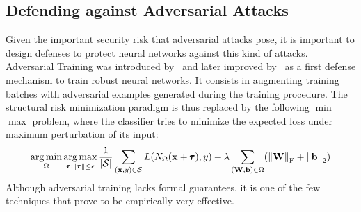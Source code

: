 \subsection{Defending against Adversarial Attacks}
\label{subsection:ch2-defending_against_adversarial_attacks}

Given the important security risk that adversarial attacks pose, it is important to design defenses to protect neural networks against this kind of attacks.
Adversarial Training was introduced by~\citet{goodfellow2014explaining} and later improved by~\citet{madry2018towards} as a first defense mechanism to train robust neural networks.
It consists in augmenting training batches with adversarial examples generated during the training procedure.
The structural risk minimization paradigm is thus replaced by the following $\min$ $\max$ problem, where the classifier tries to minimize the expected loss under maximum perturbation of its input:
\begin{equation}
\argmin_\Omega \argmax_{\adv: \norm{\adv} \leq \epsilon} \frac{1}{|\mathcal{S}|} \sum_{(\xvec, y) \in \mathcal{S}} L\left( N_\Omega \left(\xvec + \adv \right), y \right) + \lambda \sum_{(\Wmat, \bvec) \in \Omega} \left( \norm{\Wmat}_\mathrm{F} + \norm{\bvec}_\mathrm{2} \right)
\end{equation}
Although adversarial training lacks formal guarantees, it is one of the few techniques that prove to be empirically very effective.






%
%
%



